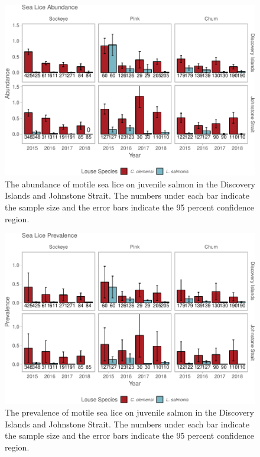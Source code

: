 \documentclass[fleqn,10pt]{wlpeerj} %
\begin{document}
\begin{figure}[H]
\includegraphics[width=0.9\linewidth]{Migration_Observations_Report_files/figure-latex/sealice-abundance-plot-1} \caption{The abundance of motile sea lice on juvenile salmon in the Discovery Islands and Johnstone Strait. The numbers under each bar indicate the sample size and the error bars indicate the 95 percent confidence region.}\label{fig:sealice-abundance-plot}
\end{figure}

\begin{figure}[H]
\includegraphics[width=0.9\linewidth]{Migration_Observations_Report_files/figure-latex/sealice-prevalence-plot-1} \caption{The prevalence of motile sea lice on juvenile salmon in the Discovery Islands and Johnstone Strait. The numbers under each bar indicate the sample size and the error bars indicate the 95 percent confidence region.}\label{fig:sealice-prevalence-plot}
\end{figure}
\end{document}
